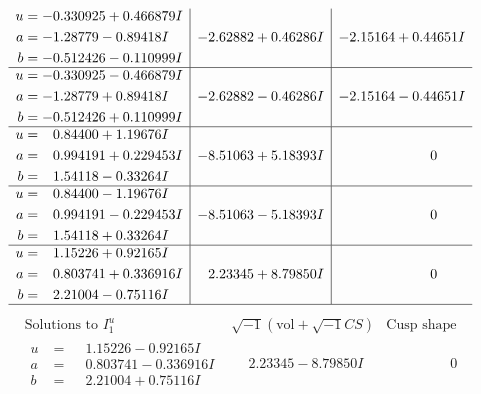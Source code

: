 \documentclass[1p]{elsarticle_modified}
\theoremstyle{definition}
\newcommand{\I}{\sqrt{-1}}
\begin{document}
$$\begin{array}{c|c|c}
\begin{aligned}
u &= -0.330925 + 0.466879 I \\
a &= -1.28779 - 0.89418 I \\
b &= -0.512426 - 0.110999 I\end{aligned}
 & -2.62882 + 0.46286 I & -2.15164 + 0.44651 I \\ \hline\begin{aligned}
u &= -0.330925 - 0.466879 I \\
a &= -1.28779 + 0.89418 I \\
b &= -0.512426 + 0.110999 I\end{aligned}
 & -2.62882 - 0.46286 I & -2.15164 - 0.44651 I \\ \hline\begin{aligned}
u &= \phantom{-}0.84400 + 1.19676 I \\
a &= \phantom{-}0.994191 + 0.229453 I \\
b &= \phantom{-}1.54118 - 0.33264 I\end{aligned}
 & -8.51063 + 5.18393 I & \phantom{-0.000000 } 0 \\ \hline\begin{aligned}
u &= \phantom{-}0.84400 - 1.19676 I \\
a &= \phantom{-}0.994191 - 0.229453 I \\
b &= \phantom{-}1.54118 + 0.33264 I\end{aligned}
 & -8.51063 - 5.18393 I & \phantom{-0.000000 } 0 \\ \hline\begin{aligned}
u &= \phantom{-}1.15226 + 0.92165 I \\
a &= \phantom{-}0.803741 + 0.336916 I \\
b &= \phantom{-}2.21004 - 0.75116 I\end{aligned}
 & \phantom{-}2.23345 + 8.79850 I & \phantom{-0.000000 } 0\\
 \hline 
 \end{array}$$\newpage$$\begin{array}{c|c|c}  
\text{Solutions to }I^u_{1}& \I (\text{vol} + \sqrt{-1}CS) & \text{Cusp shape}\\
 \hline 
\begin{aligned}
u &= \phantom{-}1.15226 - 0.92165 I \\
a &= \phantom{-}0.803741 - 0.336916 I \\
b &= \phantom{-}2.21004 + 0.75116 I\end{aligned}
 & \phantom{-}2.23345 - 8.79850 I & \phantom{-0.000000 } 0 \\ \hline\begin{aligned}

\end{aligned}
\end{array}$$
\end{document}
